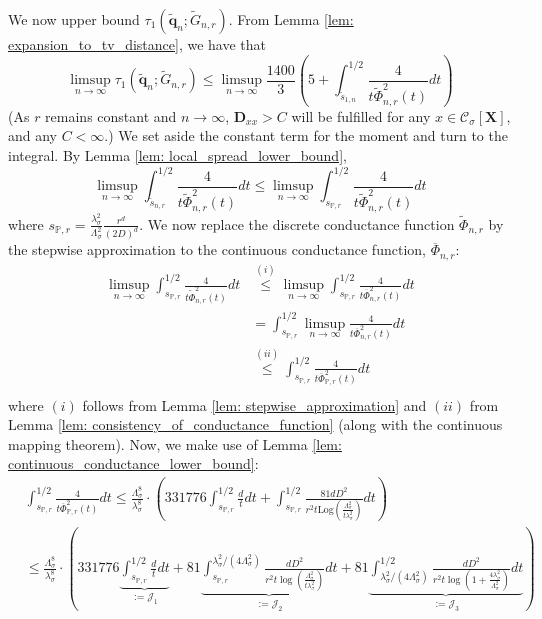 \documentclass{article}
\newcommand{\1}{\mathbf{1}}
\newcommand{\Log}{\mathrm{Log}}
\newcommand{\qbf}{\mathbf{q}}
\newcommand{\Xbf}{\mathbf{X}}
\newcommand{\Dbf}{\mathbf{D}}
\newcommand{\Pbb}{\mathbb{P}}
\newcommand{\Cset}{\mathcal{C}}
\newcommand{\Csig}{\Cset_{\sigma}}
\theoremstyle{aldenthm}
\begin{document}
We now upper bound $\tau_{1}(\widetilde{\qbf}_n; \widetilde{G}_{n,r})$.  From Lemma \ref{lem: expansion_to_tv_distance}, we have that
\begin{equation}
\label{eqn: mixing_time_bound_on_neighborhood_graph}
\limsup_{n \to \infty} \tau_{1}(\widetilde{\qbf}_n; \widetilde{G}_{n,r}) \leq \limsup_{n \to \infty} \frac{1400}{3}\left(5 + \int_{\widetilde{s}_{1,n}}^{1/2} \frac{4}{t\widetilde{\Phi}_{n,r}^2(t)} dt\right)
\end{equation}
(As $r$ remains constant and $n \to \infty$, $\Dbf_{xx} > C$ will be fulfilled for any $x \in \Csig[\Xbf]$, and any $C < \infty$.)
We set aside the constant term for the moment and turn to the integral. By Lemma \ref{lem: local_spread_lower_bound},
\begin{equation*}
\limsup_{n \to \infty}\int_{\widetilde{s}_{n,r}}^{1/2} \frac{4}{t\widetilde{\Phi}_{n,r}^2(t)} dt \leq \limsup_{n \to \infty}\int_{ s_{\Pbb,r}}^{1/2} \frac{4}{t\widetilde{\Phi}_{n,r}^2(t)} dt
\end{equation*}
where $s_{\Pbb,r} = \frac{\lambda_{\sigma}^2}{\Lambda_{\sigma}^2} \frac{r^d}{(2D)^d}$. We now replace the discrete conductance function $\widetilde{\Phi}_{n,r}$ by the stepwise approximation to the continuous conductance function, $\overline{\Phi}_{n,r}$:
\begin{align*}
\limsup_{n \to \infty}\int_{s_{\Pbb,r}}^{1/2} \frac{4}{t\widetilde{\Phi}_{n,r}^2(t)} dt & \overset{(i)}{\leq} \limsup_{n \to \infty}\int_{s_{\Pbb,r}}^{1/2} \frac{4}{t\overline{\Phi}_{n,r}^2(t)} dt \\
& = \int_{s_{\Pbb,r}}^{1/2} \limsup_{n \to \infty} \frac{4}{t\overline{\Phi}_{n,r}^2(t)} dt\\
& \overset{(ii)}{\leq} \int_{s_{\Pbb,r}}^{1/2} \frac{4}{t\overline{\Phi}_{\Pbb,r}^2(t)} dt \\
\end{align*}
where $(i)$ follows from Lemma \ref{lem: stepwise_approximation} and $(ii)$ from Lemma \ref{lem: consistency_of_conductance_function} (along with the continuous mapping theorem). Now, we make use of Lemma \ref{lem: continuous_conductance_lower_bound}:
\begin{align*}
& \int_{s_{\Pbb,r}}^{1/2} \frac{4}{t\overline{\Phi}_{\Pbb,r}^2(t)} dt \leq \frac{\Lambda_{\sigma}^8}{\lambda_{\sigma}^8} \cdot \left( 331776
\int_{s_{\Pbb,r}}^{1/2} \frac{d}{t} dt + \int_{s_{\Pbb,r}}^{1/2} \frac{81dD^2}{r^2t \Log(\frac{\Lambda_{\sigma}^2}{t\lambda_{\sigma}^2})}  dt\right) \\
& \leq \frac{\Lambda_{\sigma}^8}{\lambda_{\sigma}^8} \cdot \left( 331776
\underbrace{\int_{s_{\Pbb,r}}^{1/2} \frac{d}{t} dt}_{:= \mathcal{J}_1} + 
81\underbrace{\int_{s_{\Pbb,r}}^{\lambda_{\sigma}^2/(4 \Lambda_{\sigma}^2)} \frac{dD^2}{r^2t \log(\frac{\Lambda_{\sigma}^2}{t\lambda_{\sigma}^2})} dt}_{:= \mathcal{J}_2} +
81\underbrace{\int_{\lambda_{\sigma}^2/(4 \Lambda_{\sigma}^2)}^{1/2} \frac{dD^2}{r^2t \log(1 + \frac{4 \lambda_{\sigma}^2}{\Lambda_{\sigma}^2})}dt}_{:= \mathcal{J}_3}  \right)
\end{align*}
\end{document}
